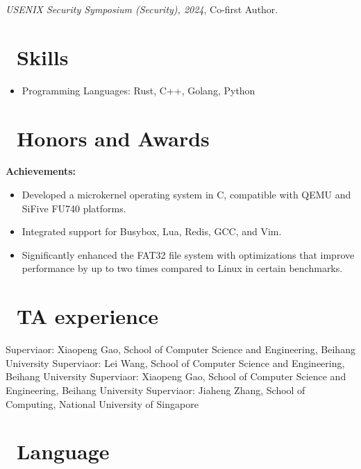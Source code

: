 \documentclass{resume}
\begin{document}
\textit{USENIX Security Symposium (Security), 2024}, Co-first Author.



\section{\faCogs\ Skills}
\begin{itemize}[parsep=0.5ex]
  \item Programming Languages: Rust, C++, Golang, Python
\end{itemize}

\section{\faTrophy\ Honors and Awards}


\textbf{Achievements:}
\begin{itemize}
  \item Developed a microkernel operating system in C, compatible with QEMU and SiFive FU740 platforms.
  \item Integrated support for Busybox, Lua, Redis, GCC, and Vim.
  \item Significantly enhanced the FAT32 file system with optimizations that improve performance by up to two times compared to Linux in certain benchmarks.
\end{itemize}



\section{\faHeartO\ TA experience}
Superviaor: Xiaopeng Gao, School of Computer Science and Engineering, Beihang University
Superviaor: Lei Wang, School of Computer Science and Engineering, Beihang University
Superviaor: Xiaopeng Gao, School of Computer Science and Engineering, Beihang University
Superviaor: Jiaheng Zhang, School of Computing, National University of Singapore


\section{\faCertificate\ Language}


%
%
\end{document}
